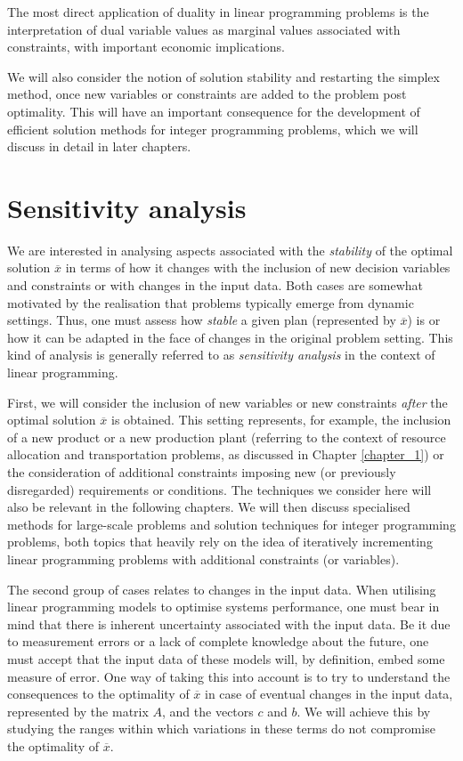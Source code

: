 
The most direct application of duality in linear programming problems is the interpretation of dual variable values as marginal values associated with constraints, with important economic implications. 

We will also consider the notion of solution stability and restarting the simplex method, once new variables or constraints are added to the problem post optimality. This will have an important consequence for the development of efficient solution methods for integer programming problems, which we will discuss in detail in later chapters.


\section{Sensitivity analysis}

We are interested in analysing aspects associated with the \emph{stability} of the optimal solution $\overline{x}$ in terms of how it changes with the inclusion of new decision variables and constraints or with changes in the input data. Both cases are somewhat motivated by the realisation that problems typically emerge from dynamic settings. Thus, one must assess how \emph{stable} a given plan (represented by $\overline{x}$) is or how it can be adapted in the face of changes in the original problem setting. This kind of analysis is generally referred to as \emph{sensitivity analysis} in the context of linear programming.

First, we will consider the inclusion of new variables or new constraints \emph{after} the optimal solution $\overline{x}$ is obtained. This setting represents, for example, the inclusion of a new product or a new production plant (referring to the context of resource allocation and transportation problems, as discussed in Chapter \ref{chapter_1}) or the consideration of additional constraints imposing new (or previously disregarded) requirements or conditions. The techniques we consider here will also be relevant in the following chapters. We will then discuss specialised methods for large-scale problems and solution techniques for integer programming problems, both topics that heavily rely on the idea of iteratively incrementing linear programming problems with additional constraints (or variables).

The second group of cases relates to changes in the input data. When utilising linear programming models to optimise systems performance, one must bear in mind that there is inherent uncertainty associated with the input data. Be it due to measurement errors or a lack of complete knowledge about the future, one must accept that the input data of these models will, by definition, embed some measure of error. One way of taking this into account is to try to understand the consequences to the optimality of $\overline{x}$ in case of eventual changes in the input data, represented by the matrix $A$, and the vectors $c$ and $b$. We will achieve this by studying the ranges within which variations in these terms do not compromise the optimality of $\overline{x}$. 



